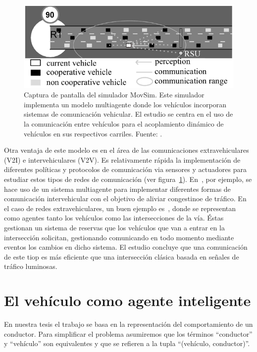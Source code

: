 \begin{figure}
	\centering
	\includegraphics{images/cooperative-traffic-movsim}
	\caption{Captura de pantalla del simulador MovSim. Este simulador implementa un modelo multiagente donde los vehículos incorporan sistemas de comunicación vehicular. El estudio se centra en el uso de la comunicación entre vehículos para el acoplamiento dinámico de vehículos en sus respectivos carriles. Fuente: \cite{Gu2015}.}
	\label{fig:cooperative-traffic-movsim}
\end{figure}

Otra ventaja de este modelo es en el área de las comunicaciones extravehiculares (V2I) e intervehiculares (V2V). Es relativamente rápida la implementación de diferentes políticas y protocolos de comunicación via sensores y actuadores para estudiar estos tipos de redes de comunicación (ver figura~\ref{fig:cooperative-traffic-movsim}). En~\cite{Shiose2001}, por ejemplo, se hace uso de un sistema multiagente para implementar diferentes formas de comunicación intervehicular con el objetivo de aliviar congestinoe de tráfico. En el caso de redes extravehiculares, un buen ejemplo es~\cite{Dresner2004}, donde se representan como agentes tanto los vehículos como las intersecciones de la vía. Éstas gestionan un sistema de reservas que los vehículos que van a entrar en la intersección solicitan, gestionando  comunicando en todo momento mediante eventos los cambios en dicho sistema. El estudio concluye que una comunicación de este tiop es más eficiente que una intersección clásica basada en señales de tráfico luminosas.

\section{El vehículo como agente inteligente}

En nuestra tesis el trabajo se basa en la representación del comportamiento de un conductor. Para simplificar el problema asumiremos que los términos \enquote{conductor} y \enquote{vehículo} son equivalentes y que se refieren a la tupla \enquote{(vehículo, conductor)}.

